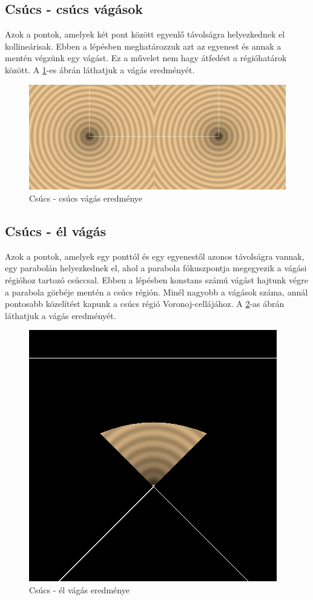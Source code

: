 \subsection{Csúcs - csúcs vágások}

Azok a pontok, amelyek két pont között egyenlő távolságra helyezkednek el kollineárisak. Ebben a lépésben meghatározzuk azt az egyenest és annak a mentén végzünk egy vágást. Ez a művelet nem hagy átfedést a régióhatárok között. A \ref{fig:vertex_vertex_cut-1}-es ábrán láthatjuk a vágás eredményét.

\begin{figure}[H]
	\centering
	\includegraphics[width=1\linewidth]{images/vertex_vertex_cut.png}
	\caption{Csúcs - csúcs vágás eredménye}
	\label{fig:vertex_vertex_cut-1}
\end{figure}

\subsection{Csúcs - él vágás} \label{vertex_segment_cut}
Azok a pontok, amelyek egy ponttól és egy egyenestől azonos távolságra vannak, egy parabolán helyezkednek el, ahol a parabola fókuszpontja megegyezik a vágási régióhoz tartozó csúccsal. Ebben a lépésben konstans számú vágást hajtunk végre a parabola görbéje mentén a csúcs régión. Minél nagyobb a vágások száma, annál pontosabb közelítést kapunk a csúcs régió Voronoj-cellájához. A \ref{fig:vertex_segment_cut-1}-as ábrán láthatjuk a vágás eredményét.

\begin{figure}[H]
	\centering
	\includegraphics[width=.55\linewidth]{images/vertex_segment_cut.png}
	\caption{Csúcs - él vágás eredménye}
	\label{fig:vertex_segment_cut-1}
\end{figure}

